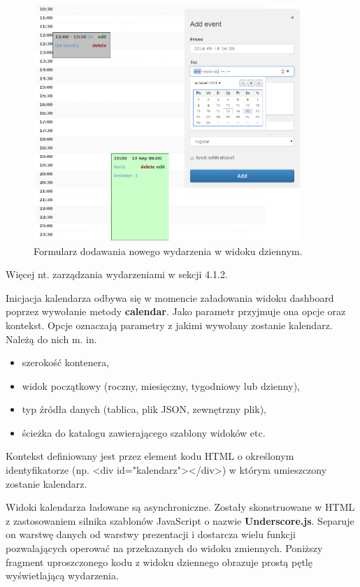\begin{figure}[H]
\centering
\includegraphics[width=0.9\textwidth]{add_event.png}
\caption{Formularz dodawania nowego wydarzenia w widoku dziennym.}
\end{figure}

Więcej nt. zarządzania wydarzeniami w sekcji 4.1.2.

Inicjacja kalendarza odbywa się w momencie załadowania widoku dashboard poprzez wywołanie metody \textbf{calendar}. Jako parametr przyjmuje ona opcje oraz kontekst. Opcje oznaczają parametry z jakimi wywołany zostanie kalendarz. Należą do nich m. in.

\begin{itemize}
\item szerokość kontenera,
\item widok początkowy (roczny, miesięczny, tygodniowy lub dzienny),
\item typ źródła danych (tablica, plik JSON, zewnętrzny plik),
\item ścieżka do katalogu zawierającego szablony widoków etc.
\end{itemize}

Kontekst definiowany jest przez element kodu HTML o określonym identyfikatorze (np. <div id="kalendarz"></div>) w którym umieszczony zostanie kalendarz.

Widoki kalendarza ładowane są asynchroniczne. Zostały skonstruowane w HTML z zastosowaniem silnika szablonów JavaScript o nazwie \textbf{Underscore.js}\cite{underscore}. Separuje on warstwę danych od warstwy prezentacji i dostarcza wielu funkcji pozwalających operować na przekazanych do widoku zmiennych. Poniższy fragment uproszczonego kodu z widoku dziennego obrazuje prostą pętlę wyświetlającą wydarzenia.


